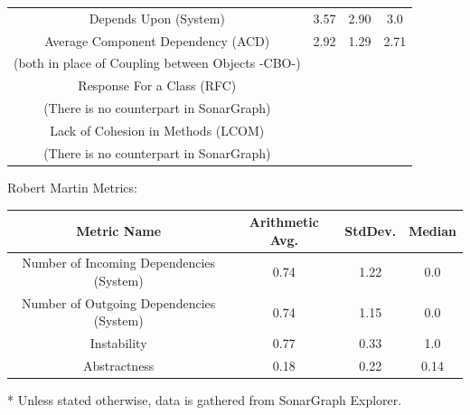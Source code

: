 \documentclass[a4paper,12pt,oneside]{scrreprt}
\begin{document}
\begin{compactitem}
\begin{center}
\begin{tabular}{ |c|c|c|c| }
					\hline
					Depends Upon (System) & 3.57 & 2.90 & 3.0\\
						Average Component Dependency (ACD) & 2.92 & 1.29 & 2.71\\
					(both in place of Coupling between Objects -CBO-)&&&\\
					\hline
				
					\hline
					Response For a Class (RFC) &&&\\
					(There is no counterpart in SonarGraph)&&&\\
					\hline
					Lack of Cohesion in Methods (LCOM) &&&\\
					(There is no counterpart in SonarGraph)&&&\\
					\hline
				\end{tabular}
			\end{center}
			\bigskip
			\bigskip
			
			\item Robert Martin Metrics:\\
			\begin{center}
				\begin{tabular}{ |c|c|c|c| } 
					\hline
					Metric Name &  Arithmetic Avg. & StdDev. & Median \\
					\hline
					Number of Incoming Dependencies (System) & 0.74 & 1.22 & 0.0\\
					
					Number of Outgoing Dependencies (System) & 0.74 & 1.15 & 0.0\\
					Instability & 0.77 & 0.33 & 1.0 \\
					Abstractness & 0.18 & 0.22 & 0.14 \\
					\hline
				\end{tabular}
			\end{center}
			
			
			
%			

	\end{compactitem}
	\bigskip

	* Unless stated otherwise, data is gathered from SonarGraph Explorer.

	
	
	
	
	
\end{document}
